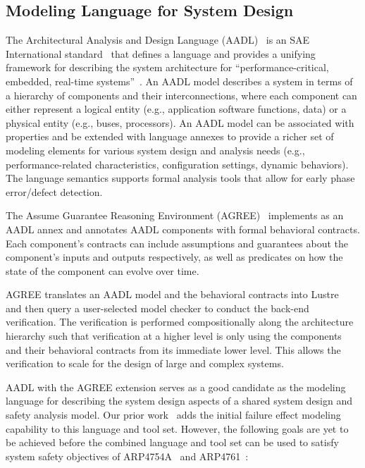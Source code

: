 \subsection{Modeling Language for System Design}
\label{subsec:aadl-agree}
The Architectural Analysis and Design Language (AADL)~\cite{FeilerModelBasedEngineering2012} is an SAE International standard~\cite{AADL_Standard} that defines a language and provides a unifying framework for describing the system architecture for ``performance-critical, embedded, real-time systems''~\cite{AADL_Standard}. An AADL model describes a system in terms of a hierarchy of components and their interconnections, where each component can either represent a logical entity (e.g., application software functions, data) or a physical entity (e.g., buses, processors). An AADL model can be associated with properties and be extended with language annexes to provide a richer set of modeling elements for various system design and analysis needs (e.g., performance-related characteristics, configuration settings, dynamic behaviors). The language semantics supports formal analysis tools that allow for early phase error/defect detection.

The Assume Guarantee Reasoning
Environment (AGREE)~\cite{NFM2012:CoGaMiWhLaLu} implements as an AADL annex and annotates AADL components with formal behavioral contracts. Each component's contracts can include assumptions and guarantees about the component's inputs and outputs respectively, as well as predicates on how the state of the component can evolve over time.

AGREE translates an AADL model and the behavioral contracts into Lustre~\cite{Halbwachs91:IEEE} and then query a user-selected
model checker to conduct the back-end verification. The verification is performed compositionally along the architecture hierarchy such that verification at a higher level is only using the components and their behavioral contracts from its immediate lower level. This allows the verification to scale for the design of large and complex systems. 

AADL with the AGREE extension serves as a good candidate as the modeling language for describing the system design aspects of a shared system design and safety analysis model. Our prior work~\cite{Stewart17:IMBSA} adds the initial failure effect modeling capability to this language and tool set. However, the following goals are yet to be achieved before the combined language and tool set can be used to satisfy system safety objectives of ARP4754A~\cite{SAE:ARP4754A} and ARP4761~\cite{SAE:ARP4761}:

